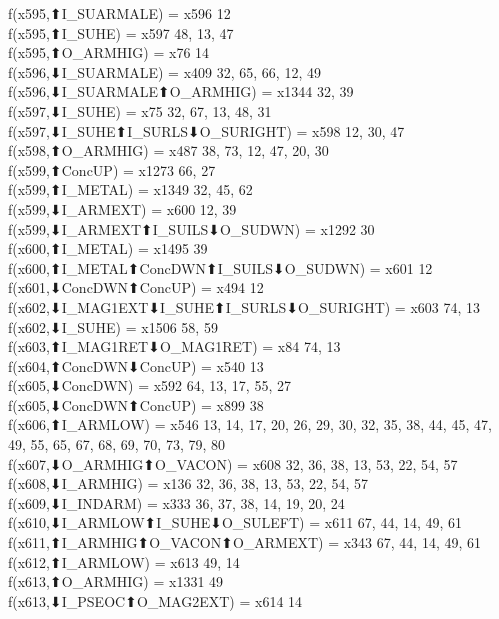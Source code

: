f(x595,⬆I_SUARMALE) = x596 {12} \\
f(x595,⬆I_SUHE) = x597 {48, 13, 47} \\
f(x595,⬆O_ARMHIG) = x76 {14} \\
f(x596,⬇I_SUARMALE) = x409 {32, 65, 66, 12, 49} \\
f(x596,⬇I_SUARMALE⬆O_ARMHIG) = x1344 {32, 39} \\
f(x597,⬇I_SUHE) = x75 {32, 67, 13, 48, 31} \\
f(x597,⬇I_SUHE⬆I_SURLS⬇O_SURIGHT) = x598 {12, 30, 47} \\
f(x598,⬆O_ARMHIG) = x487 {38, 73, 12, 47, 20, 30} \\
f(x599,⬆ConcUP) = x1273 {66, 27} \\
f(x599,⬆I_METAL) = x1349 {32, 45, 62} \\
f(x599,⬇I_ARMEXT) = x600 {12, 39} \\
f(x599,⬇I_ARMEXT⬆I_SUILS⬇O_SUDWN) = x1292 {30} \\
f(x600,⬆I_METAL) = x1495 {39} \\
f(x600,⬆I_METAL⬆ConcDWN⬆I_SUILS⬇O_SUDWN) = x601 {12} \\
f(x601,⬇ConcDWN⬆ConcUP) = x494 {12} \\
f(x602,⬇I_MAG1EXT⬇I_SUHE⬆I_SURLS⬇O_SURIGHT) = x603 {74, 13} \\
f(x602,⬇I_SUHE) = x1506 {58, 59} \\
f(x603,⬆I_MAG1RET⬇O_MAG1RET) = x84 {74, 13} \\
f(x604,⬆ConcDWN⬇ConcUP) = x540 {13} \\
f(x605,⬇ConcDWN) = x592 {64, 13, 17, 55, 27} \\
f(x605,⬇ConcDWN⬆ConcUP) = x899 {38} \\
f(x606,⬆I_ARMLOW) = x546 {13, 14, 17, 20, 26, 29, 30, 32, 35, 38, 44, 45, 47, 49, 55, 65, 67, 68, 69, 70, 73, 79, 80} \\
f(x607,⬇O_ARMHIG⬆O_VACON) = x608 {32, 36, 38, 13, 53, 22, 54, 57} \\
f(x608,⬇I_ARMHIG) = x136 {32, 36, 38, 13, 53, 22, 54, 57} \\
f(x609,⬇I_INDARM) = x333 {36, 37, 38, 14, 19, 20, 24} \\
f(x610,⬇I_ARMLOW⬆I_SUHE⬇O_SULEFT) = x611 {67, 44, 14, 49, 61} \\
f(x611,⬆I_ARMHIG⬆O_VACON⬆O_ARMEXT) = x343 {67, 44, 14, 49, 61} \\
f(x612,⬆I_ARMLOW) = x613 {49, 14} \\
f(x613,⬆O_ARMHIG) = x1331 {49} \\
f(x613,⬇I_PSEOC⬆O_MAG2EXT) = x614 {14} \\
